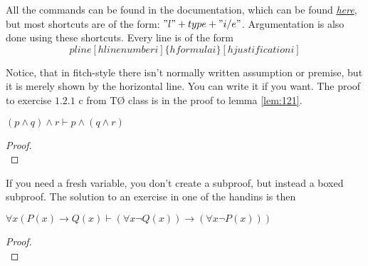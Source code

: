\documentclass[a4, english]{article}
\begin{document}
All the commands can be found in the documentation, which can be found \href{http://mirrors.dotsrc.org/ctan/macros/latex/contrib/lplfitch/lplfitch.pdf}{\emph{here}}, but most shortcuts are of the form: $"l" + type + "i/e"$. Argumentation is also done using these shortcuts. Every line is of the form
\begin{equation*}
    pline[hline number i]\{hformulai\}[hjustificationi]
\end{equation*}

Notice, that in fitch-style there isn't normally written assumption or premise, but it is merely shown by the horizontal line. You can write it if you want. The proof to exercise $1.2.1$ c from TØ class is in the proof to lemma \ref{lem:121}.
\begin{lemma} \label{lem:121}
	$(p \wedge q) \wedge r \vdash p \wedge (q \wedge r)$
\end{lemma}
\begin{proof}
	 \\
\end{proof}

If you need a fresh variable, you don't create a subproof, but instead a boxed subproof. The solution to an exercise in one of the handins is then
\begin{theorem} \label{theo:handin}
	$\forall x (P(x) \rightarrow Q(x) \vdash (\forall x \neg Q(x)) \rightarrow (\forall x \neg P(x)))$
\end{theorem}
\begin{proof}
	 \\
\end{proof}
\end{document}
